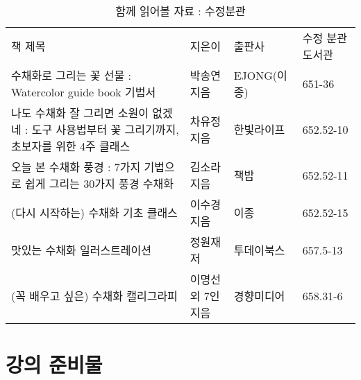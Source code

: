 \documentclass[12pt, a4paper, oneside]{book}
\let\stdsection\section
\renewcommand\section{\newpage\stdsection}
\begin{document}
		\begin{table}[hbp]
		\caption{ 함께 읽어볼 자료 : 수정분관}
		\centering 

		\tabulinesep=4pt

		\begin{tabu} to \linewidth{ X[r,4] X[r,1] X[r,1] X[r,1]   }
			\toprule
			책 제목	&지은이	&출판사	&수정 분관  도서관\\
			\tabucline[1pt]{-}
수채화로 그리는 꽃 선물 : Watercolor guide book 기법서										&박송연 지음	&EJONG(이종)		&651-36 		\\
나도 수채화 잘 그리면 소원이 없겠네 : 도구 사용법부터 꽃 그리기까지, 초보자를 위한 4주 클래스 		&차유정 지음	&한빛라이프			&652.52-10 \\
오늘 본 수채화 풍경 : 7가지 기법으로 쉽게 그리는 30가지 풍경 수채화 								&김소라 지음	&책밥				&652.52-11 \\
(다시 시작하는) 수채화 기초 클래스															&이수경 지음	&이종				&652.52-15 	\\
맛있는 수채화 일러스트레이션																&정원재 저	&투데이북스			&657.5-13	\\
(꼭 배우고 싶은) 수채화 캘리그라피															&이명선 외 7인 지음	&경향미디어	&658.31-6\\
			\bottomrule
		\end{tabu}

		\end{table}





%
	\section{ 강의 준비물 }




\end{document}
